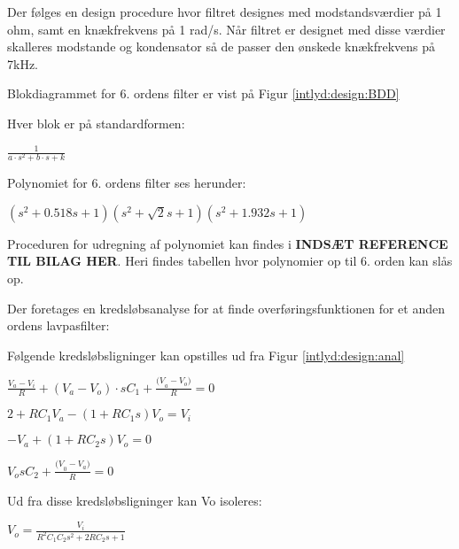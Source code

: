 
Der følges en design procedure hvor filtret designes med modstandsværdier på 1 ohm, samt en knækfrekvens på 1 rad/s. Når filtret er designet med disse værdier skalleres modstande og kondensator så de passer den ønskede knækfrekvens på 7kHz. 

Blokdiagrammet for 6. ordens filter er vist på Figur \ref{intlyd:design:BDD}


Hver blok er på standardformen:
\begin{center}
$\frac { 1 }{ { a\cdot s }^{ 2 }+b\cdot s+k }$ 
\end{center}

Polynomiet for 6. ordens filter ses herunder:
\begin{center}
$({ s }^{ 2 }+0.518s+1)({ s }^{ 2 }+\sqrt { 2 } s+1)({ s }^{ 2 }+1.932s+1)$
\end{center}

Proceduren for udregning af polynomiet kan findes i \textbf{INDSÆT REFERENCE TIL BILAG HER}. Heri findes tabellen hvor polynomier op til 6. orden kan slås op. 

Der foretages en kredsløbsanalyse for at finde overføringsfunktionen for et anden ordens lavpasfilter:


Følgende kredsløbsligninger kan opstilles ud fra Figur \ref{intlyd:design:anal}
\begin{center}
$\frac { { V }_{ a }-{ V }_{ i } }{ R } +({ V }_{ a }-{ V }_{ o })\cdot s{ C }_{ 1 }+\frac { { (V }_{ a }-{ V }_{ o }) }{ R } =0$

$2+R{ C }_{ 1 }{ V }_{ a }-(1+R{ C }_{ 1 }s){ V }_{ o }={ V }_{ i }$

$-{ V }_{ a }+(1+R{ C }_{ 2 }s){ V }_{ o }=0$

${ V }_{ o }s{ C }_{ 2 }+\frac { { (V }_{ 0 }-{ V }_{ a }) }{ R } =0$
\end{center}

Ud fra disse kredsløbsligninger kan Vo isoleres: 
\begin{center}
${ V }_{ o }=\frac { { V }_{ i } }{ { R }^{ 2 }{ C }_{ 1 }{ C }_{ 2 }{ s }^{ 2 }+2R{ C }_{ 2 }s+1 }$
\end{center}

